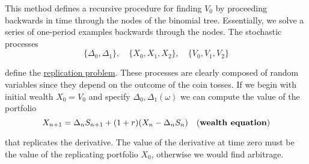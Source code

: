 \documentclass[12pt]{article}
\newlength\tindent
\renewcommand{\indent}{\hspace*{\tindent}}
\begin{document}
\indent This method defines a recursive procedure for finding $V_0$ by proceeding backwards in time through the nodes of the binomial tree. Essentially, we solve a series of one-period examples backwards through the nodes. The stochastic processes
\begin{equation*}
	\{\Delta_0,\Delta_1\}, \quad \{X_0,X_1,X_2\}, \quad \{V_0,V_1,V_2\}
\end{equation*}

define the \underline{replication problem}. These processes are clearly composed of random variables since they depend on the outcome of the coin tosses. If we begin with initial wealth $X_0 = V_0$ and specify $\Delta_0,\Delta_1(\omega)$ we can compute the value of the portfolio
\begin{equation*}
	X_{n + 1} = \Delta_nS_{n + 1} + (1 + r)(X_n - \Delta_nS_n) \quad (\text{\bf wealth equation})
\end{equation*}

that replicates the derivative. The value of the derivative at time zero must be the value of the replicating portfolio $X_0$, otherwise we would find arbitrage.
\end{document}
